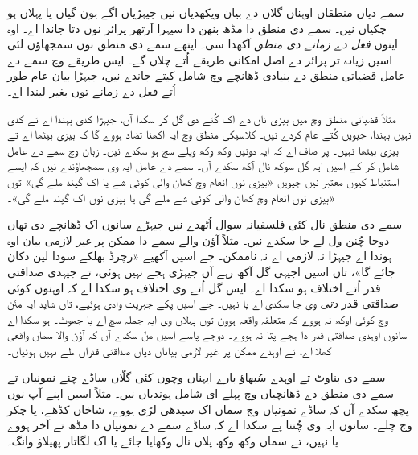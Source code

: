 \documentclass[../../../include/open-logic-section]{subfiles}
\begin{document}


سمے دیاں منطقاں اوہناں گلاں دے بیان ویکھدیاں نیں جیہڑیاں اگے ہون
گیاں یا پہلاں ہو چکیاں نیں۔ سمے دی منطق دا مڈھ بنھن دا سیہرا آرتھر
پرائر نوں دتا جاندا اے۔ اوہ اینوں \emph{فعل دے زمانے دی منطق} آکھدا سی۔
ایتھے سمے دی منطق نوں سمجھاؤن لئی اسیں زیادہ تر پرائر دے اصل امکانی
طریقے اُتے چلاں گے۔ ایس طریقے وچ سمے دے عامل قضیاتی منطق دے بنیادی
ڈھانچے وچ شامل کیتے جاندے نیں، جیہڑا بیان عام طور اُتے فعل دے زمانے
توں بغیر لیندا اے۔

مثلاً قضیاتی منطق وچ میں بیزی ناں دے اک کُتے دی گل کر سکدا آں، جیہڑا
کدی بہندا اے تے کدی نہیں بہندا، جیویں کُتے عام کردے نیں۔ کلاسیکی منطق
وچ ایہ آکھنا تضاد ہووے گا کہ بیزی بیٹھا اے تے بیزی بیٹھا نہیں۔ پر صاف
اے کہ ایہ دونیں وکھ وکھ ویلے سچ ہو سکدے نیں۔ زبان وچ سمے دے عامل شامل
کر کے اسیں ایہ گل سوکھ نال آکھ سکدے آں۔ سمے دے عامل ایہ وی سمجھاؤندے
نیں کہ ایسے استنباط کیوں معتبر نیں جیویں «بیزی نوں انعام وچ کھان والی
کوئی شے یا اک گیند ملے گی» توں «بیزی نوں انعام وچ کھان والی کوئی شے
ملے گی یا بیزی نوں اک گیند ملے گی»۔

سمے دی منطق نال کئی فلسفیانہ سوال اُٹھدے نیں جیہڑے سانوں اک ڈھانچے
دی تھاں دوجا چُنن ول لے جا سکدے نیں۔ مثلاً آؤن والے سمے دا ممکن پر
غیر لازمی بیان اوہ ہوندا اے جیہڑا نہ لازمی اے نہ ناممکن۔ جے اسیں آکھیے
«رچرڈ بھلکے سودا لین دکان جائے گا»، تاں اسیں اجیہی گل آکھ رہے آں
جیہڑی ہجے نہیں ہوئی، تے جیہدی صداقتی قدر اُتے اختلاف ہو سکدا اے۔
ایس گل اُتے وی اختلاف ہو سکدا اے کہ اوہنوں کوئی صداقتی قدر \emph{دتی}
وی جا سکدی اے یا نہیں۔ جے اسیں پکے جبریت وادی ہوئیے، تاں شاید ایہ منّن
وچ کوئی اوکھ نہ ہووے کہ متعلقہ واقعہ ہوون توں پہلاں وی ایہ جملہ سچ اے
یا جھوٹ۔ ہو سکدا اے سانوں اوہدی صداقتی قدر دا ہجے پتا نہ ہووے۔
دوجے پاسے اسیں منّ سکدے آں کہ آؤن والا سماں واقعی کھلا اے، تے اوہدے
ممکن پر غیر لازمی بیاناں دیاں صداقتی قدراں طے نہیں ہوئیاں۔

سمے دی بناوٹ تے اوہدے سُبھاؤ بارے ایہناں وچوں کئی گلّاں ساڈے چنے
نمونیاں تے سمے دی منطق دے ڈھانچیاں وچ پہلے ای شامل ہوندیاں نیں۔
مثلاً اسیں اپنے آپ نوں پچھ سکدے آں کہ ساڈے نمونیاں وچ سماں اک سیدھی
لڑی ہووے، شاخاں کڈھے، یا چکر وچ چلے۔ سانوں ایہ وی چُننا پے سکدا اے
کہ ساڈے سمے دے نمونیاں دا مڈھ تے آخر ہووے یا نہیں، تے سماں وکھ وکھ
پلاں نال وکھایا جائے یا اک لگاتار پھیلاؤ وانگ۔
\end{document}
